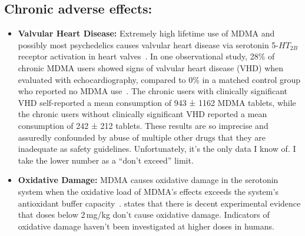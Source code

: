 \documentclass[11pt,oneside]{book}
\let\cite\parencite
\begin{document}
\subsection*{Chronic adverse effects:}
\begin{itemize}
    \item \textbf{Valvular Heart Disease:} Extremely high lifetime use of MDMA and possibly most psychedelics causes valvular heart disease via serotonin 5-$HT_{2B}$ receptor activation in heart valves~\cite{droogmans2007valvular,tagen2023valvular}. In one observational study, 28\% of chronic MDMA users showed signs of valvular heart disease (VHD) when evaluated with echocardiography, compared to 0\% in a matched control group who reported no MDMA use~\cite{droogmans2007valvular}. The chronic users with clinically significant VHD self-reported a mean consumption of 943 ± 1162 MDMA tablets, while the chronic users without clinically significant VHD reported a mean consumption of 242 ± 212 tablets. These results are so imprecise and assuredly confounded by abuse of multiple other drugs that they are inadequate as safety guidelines. Unfortunately, it's the only data I know of. I take the lower number as a \enquote{don't exceed} limit.
    \item \textbf{Oxidative Damage:} MDMA causes oxidative damage in the serotonin system when the oxidative load of MDMA's effects exceeds the system's antioxidant buffer capacity~\cite{baggottDamage}. \textcite{baggottSupplements} states that there is decent experimental evidence that doses below 2\,mg/kg don't cause oxidative damage. Indicators of oxidative damage haven't been investigated at higher doses in humans.
    

\end{itemize}
\end{document}
